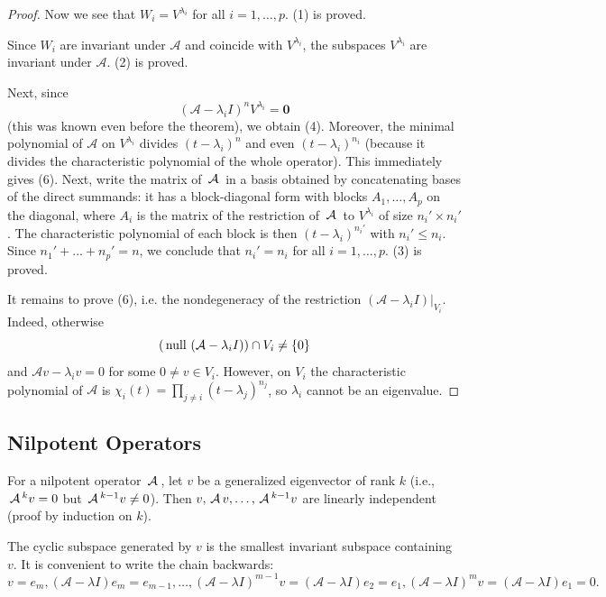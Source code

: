 \begin{proof}
Now we see that $W_i = V^{\lambda_i}$ for all $i = 1, \ldots, p$. (1) is proved.

Since $W_i$ are invariant under $\mathcal{A}$ and coincide with $V^{\lambda_i}$, the subspaces $V^{\lambda_i}$ are invariant under $\mathcal{A}$. (2) is proved.

Next, since 
$$
\left(\mathcal{A}-\lambda_i I\right)^n V^{\lambda_i}=\mathbf{0}
$$
(this was known even before the theorem), we obtain (4). Moreover, the minimal polynomial of $\mathcal{A}$ on $V^{\lambda_i}$ divides $\left(t-\lambda_i\right)^{n}$ and even $\left(t-\lambda_i\right)^{n_i}$ (because it divides the characteristic polynomial of the whole operator). This immediately gives (6). Next, write the matrix of $\,\mathcal{A}\,$ in a basis obtained by concatenating bases of the direct summands: it has a block-diagonal form with blocks $A_1, \ldots, A_p$ on the diagonal, where $A_i$ is the matrix of the restriction of $\,\mathcal{A}\,$ to $V^{\lambda_i}$ of size $n_i' \times n_i'$. The characteristic polynomial of each block is then $\left(t-\lambda_i\right)^{n_i'}$ with $n_i' \leqslant n_i$. Since $n_1' + \ldots + n_p' = n$, we conclude that $n_i' = n_i$ for all $i = 1, \ldots, p$. (3) is proved.

It remains to prove (6), i.e. the nondegeneracy of the restriction $\left.\left(\mathcal{A}-\lambda_i I\right)\right|_{V_i}$. Indeed, otherwise
$$\left(\,\mathrm{null}\,\left(\mathcal{A}-\lambda_i I\right)\right) \cap V_i \neq \{0\}$$
and $\mathcal{A} v-\lambda_i v = 0$ for some $0 \neq v \in V_i$. However, on $V_i$ the characteristic polynomial of $\mathcal{A}$ is $\chi_i(t)=\prod_{j \neq i}\left(t-\lambda_j\right)^{n_j}$, so $\lambda_i$ cannot be an eigenvalue.
\end{proof}

\subsection{Nilpotent Operators}

For a nilpotent operator $\,\mathcal{A}\,$, let $v$ be a generalized eigenvector of rank $k$ (i.e., $\,\mathcal{A}\,^{k}v=0$ but $\,\mathcal{A}\,^{k-1}v\neq 0$). Then $v, \,\mathcal{A}\, v, \ldots, \,\mathcal{A}\,^{k-1}v$ are linearly independent (proof by induction on $k$).

The cyclic subspace generated by $v$ is the smallest invariant subspace containing $v$. It is convenient to write the chain backwards: 
$$v = e_m, (\mathcal{A} - \lambda I) e_m = e_{m-1}, \ldots, (\mathcal{A} - \lambda I)^{m-1}v = (\mathcal{A} - 
\lambda I)e_2 = e_1,(\mathcal{A} - \lambda I)^{m}v = (\mathcal{A} - \lambda I) e_1 = 0.
$$

